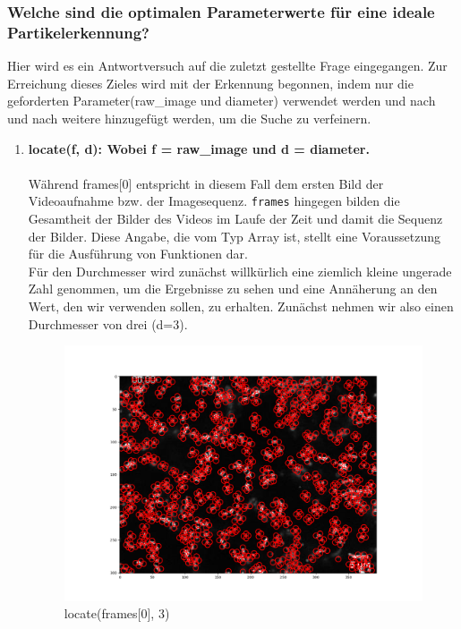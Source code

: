 	\subsubsection{Welche sind die optimalen Parameterwerte für eine ideale Partikelerkennung?}
	Hier wird es ein Antwortversuch auf die zuletzt gestellte Frage eingegangen. Zur Erreichung dieses Zieles wird mit der Erkennung begonnen, indem nur die geforderten Parameter(raw\_image und diameter) verwendet werden und nach und nach weitere hinzugefügt werden, um die Suche zu verfeinern. 
	
	\begin{enumerate}
    			\item \textbf{locate(f, d): Wobei f = raw\_image und d = diameter.} \\ \\
    			 Während frames[0] entspricht in diesem Fall dem ersten Bild der Videoaufnahme bzw. der Imagesequenz. \texttt{frames} hingegen bilden die Gesamtheit der Bilder des Videos im Laufe der Zeit und damit die Sequenz der Bilder.  Diese Angabe, die vom Typ Array ist, stellt eine Voraussetzung für die Ausführung von Funktionen dar. \\
    			 Für den Durchmesser wird zunächst willkürlich eine ziemlich kleine ungerade Zahl genommen, um die Ergebnisse zu sehen und eine Annäherung an den Wert, den wir verwenden sollen, zu erhalten. Zunächst nehmen wir also einen Durchmesser von drei (d=3).  
    			 
\begin{figure}[H]
    \centering
    \includegraphics[scale=0.35]{Grafiken/trackpyBilder/locate(f0, diameter=3).png}
    \caption{locate(frames[0], 3)}
    \label{fig:bild_label}
\end{figure} 


\end{enumerate}
